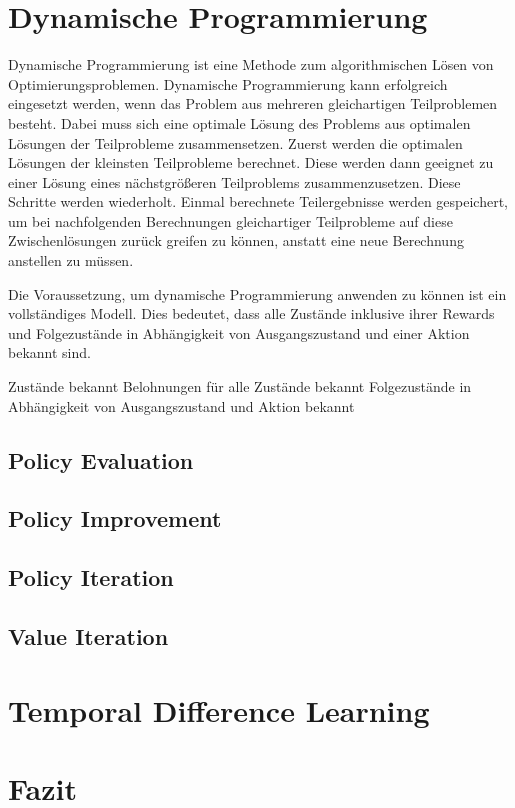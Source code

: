 \documentclass[10pt]{scrartcl}
\begin{document}
\section{Dynamische Programmierung}

Dynamische Programmierung ist eine Methode zum algorithmischen Lösen von Optimierungsproblemen. Dynamische Programmierung kann erfolgreich eingesetzt werden, wenn das Problem aus mehreren gleichartigen Teilproblemen besteht. Dabei muss sich eine optimale Lösung des Problems aus optimalen Lösungen der Teilprobleme zusammensetzen. Zuerst werden die optimalen Lösungen der kleinsten Teilprobleme berechnet. Diese werden dann geeignet zu einer Lösung eines nächstgrößeren Teilproblems zusammenzusetzen. Diese Schritte werden wiederholt. Einmal berechnete Teilergebnisse werden gespeichert, um bei nachfolgenden Berechnungen gleichartiger Teilprobleme auf diese Zwischenlösungen zurück greifen zu können, anstatt eine neue Berechnung anstellen zu müssen. 

Die Voraussetzung, um dynamische Programmierung anwenden zu können ist ein vollständiges Modell. Dies bedeutet, dass alle Zustände inklusive ihrer Rewards und Folgezustände in Abhängigkeit von Ausgangszustand und einer Aktion bekannt sind.

Zustände bekannt
Belohnungen für alle Zustände bekannt
Folgezustände in Abhängigkeit von Ausgangszustand und Aktion
bekannt

\subsection{Policy Evaluation}
\subsection{Policy Improvement}
\subsection{Policy Iteration}
\subsection{Value Iteration}


\section{Temporal Difference Learning}

\section{Fazit}
\end{document}
